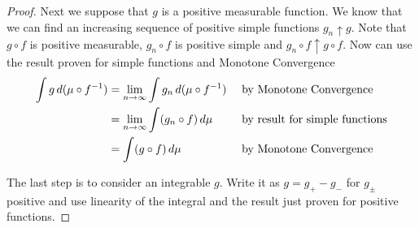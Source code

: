 \documentclass{amsart}
\theoremstyle{remark}
\theoremstyle{definition}
\begin{document}
\begin{proof}
Next we suppose that $g$ is a positive measurable function.  We know
that we can find an increasing sequence of positive simple functions
$g_n \uparrow g$.  Note that $g \circ f$ is positive measurable, $g_n
\circ f$ is positive simple and $g_n \circ f \uparrow g \circ f$.  Now
can use the result proven for simple functions and Monotone
Convergence 
\begin{align*}
\int g \, d(\mu \circ f^{-1}) &= \lim_{n \to \infty} \int g_n
\, d(\mu \circ f^{-1}) & &\text{ by Monotone Convergence} \\
&= \lim_{n \to \infty} \int (g_n \circ f)
\, d\mu & &\text{ by result for simple functions} \\
&=\int (g \circ f)
\, d\mu & &\text{ by Monotone Convergence} \\
\end{align*}

The last step is to consider an integrable $g$.  Write it as $g = g_+
- g_-$ for $g_\pm$ positive and use linearity of the integral and the
result just proven for positive functions.
\end{proof}
\end{document}
